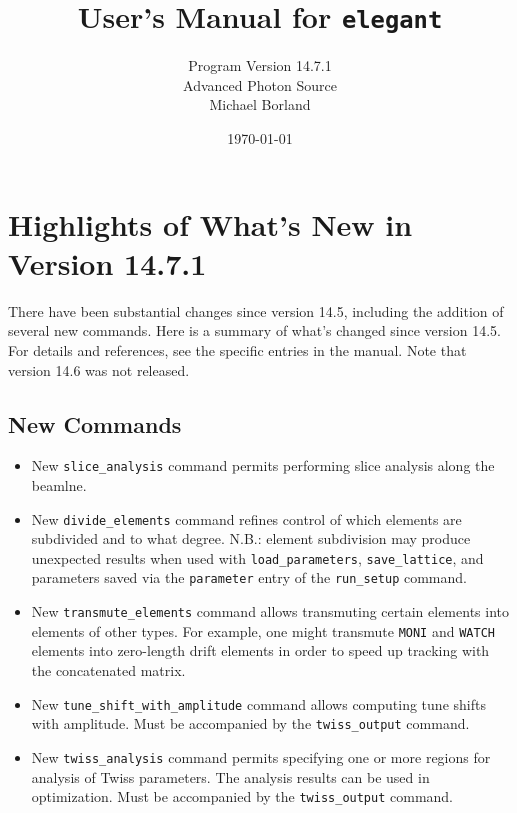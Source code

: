 \documentclass[11pt]{article}
\begin{document}
\title{User's Manual for {\tt elegant}}
\author{Program Version 14.7.1\\Advanced Photon Source\\Michael Borland\\ \date{\today}}
\maketitle

\section{Highlights of What's New in Version 14.7.1}

There have been substantial changes since version 14.5, including the
addition of several new commands.  Here is a summary of what's changed
since version 14.5.  For details and references, see the specific
entries in the manual.  Note that version 14.6 was not released.

\subsection{New Commands}

\begin{itemize}
\item New \verb|slice_analysis| command permits performing slice analysis
	along the beamlne.  
\item New \verb|divide_elements| command refines control of which elements
	are subdivided and to what degree.  N.B.: element subdivision may
	produce unexpected results when used with \verb|load_parameters|,
	\verb|save_lattice|, and parameters saved via the \verb|parameter|
	entry of the \verb|run_setup| command.
\item New \verb|transmute_elements| command allows transmuting certain elements
	into elements of other types.  For example, one might transmute 
	\verb|MONI| and \verb|WATCH| elements into zero-length drift elements
	in order to speed up tracking with the concatenated matrix.
\item New \verb|tune_shift_with_amplitude| command allows computing tune shifts
	with amplitude.  Must be accompanied by the \verb|twiss_output| command.
\item New \verb|twiss_analysis| command permits specifying one or more regions for
	analysis of Twiss parameters.  The analysis results can be used in
	optimization.  Must be accompanied by the \verb|twiss_output| command.
\end{itemize}
\end{document}

